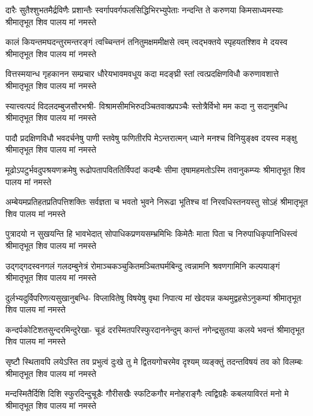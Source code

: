 \fourlineindentedshloka
{दारैः सुतैश्शुभतमैर्द्रविणैः प्रशान्तैः}
{स्वर्गापवर्गफलसिद्धिभिरभ्युपेताः}
{नन्दन्ति ते करुणया किमसाध्यमस्याः}
{श्रीमातृभूत शिव पालय मां नमस्ते} %

\fourlineindentedshloka
{कालं कियन्तमघदन्तुरमन्तरङ्गं}
{त्वच्चिन्तनं तनितुमक्षममीक्षसे त्वम्}
{त्वद्भक्तये स्पृहयतश्शिव मे दयस्व}
{श्रीमातृभूत शिव पालय मां नमस्ते} %

\fourlineindentedshloka
{वित्तस्मयान्ध गृहकानन सम्प्रचार}
{धौरेयभावमवधूय कदा मदङ्घ्री}
{स्तां त्वत्प्रदक्षिणविधौ करुणावशात्ते}
{श्रीमातृभूत शिव पालय मां नमस्ते} %

\fourlineindentedshloka
{स्यात्त्वत्पदं विदलदम्बुजसौरभश्री-}
{विश्रामसीमभिरुदञ्चितवाक्प्रपञ्चैः}
{स्तोत्रैर्विभो मम कदा नु सदानुबन्धि}
{श्रीमातृभूत शिव पालय मां नमस्ते} %

\fourlineindentedshloka
{पादौ प्रदक्षिणविधौ भवदर्चनेषु}
{पाणी स्तवेषु फणितीरपि मेऽन्तरात्मन्}
{ध्याने मनश्च विनियुङ्क्ष्व दयस्व मङ्क्षु}
{श्रीमातृभूत शिव पालय मां नमस्ते} %

\fourlineindentedshloka
{मूढोऽपटुर्भवदुपश्रयणक्रमेषु}
{रूढोपतापविततिर्विपदां कदम्बैः}
{सीमा तृषामहमतोऽस्मि तवानुकम्प्यः}
{श्रीमातृभूत शिव पालय मां नमस्ते} %

\fourlineindentedshloka
{अम्बेयमप्रतिहतप्रतिपत्तिशक्तिः}
{सर्वज्ञता च भवतो भुवने निरूढा}
{भूतिश्च वां निरवधिस्तनयस्तु सोऽहं}
{श्रीमातृभूत शिव पालय मां नमस्ते} %

\fourlineindentedshloka
{पुत्रादयो न सुखयन्ति हि भावभेदात्}
{सोपाधिकप्रणयसम्भ्रमिभिः किमेतैः}
{माता पिता च निरुपाधिकृपानिधिस्त्वं}
{श्रीमातृभूत शिव पालय मां नमस्ते} %

\fourlineindentedshloka
{उद्गद्गदस्वनगलं गलदम्बुनेत्रं}
{रोमाञ्चकञ्चुकितमञ्चितघर्मबिन्दु}
{त्वन्नामनि श्रवणगामिनि कल्पयाङ्गं}
{श्रीमातृभूत शिव पालय मां नमस्ते} %

\fourlineindentedshloka
{दुर्लभ्यदुर्विपरिणत्यसुखानुबन्धि-}
{विप्लावितेषु विषयेषु वृथा निपात्य}
{मां खेदयन्न कथमुद्वहसेऽनुकम्पां}
{श्रीमातृभूत शिव पालय मां नमस्ते} %

\fourlineindentedshloka
{कन्दर्पकोटिशतसुन्दरमिन्दुरेखा-}
{चूडं दरस्मितपरिस्फुरदाननेन्दुम्}
{कान्तं नगेन्द्रसुतया कलये भवन्तं}
{श्रीमातृभूत शिव पालय मां नमस्ते} %

\fourlineindentedshloka
{सृष्टौ स्थितावपि लयेऽस्ति तव प्रभुत्वं}
{दुःखे तु मे द्वितयगोचरमेव दृश्यम्}
{व्यङ्क्तुं तदन्तविषयं तव को विलम्बः}
{श्रीमातृभूत शिव पालय मां नमस्ते} %

\fourlineindentedshloka
{मन्दस्मितैर्दिशि दिशि स्फुरदिन्दुचूडैः}
{गौरीसखैः स्फटिकगौर मनोहराङ्गैः}
{त्वद्विग्रहैः कबलयाविरतं मनो मे}
{श्रीमातृभूत शिव पालय मां नमस्ते} %

